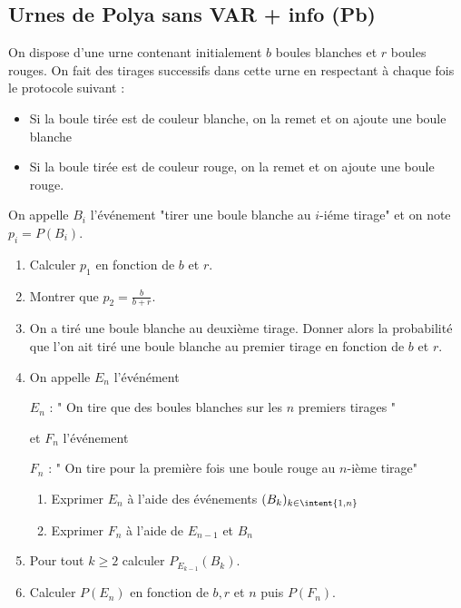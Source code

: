 \subsection{Urnes de Polya sans VAR + info (Pb)}
\begin{exercice}
On dispose d'une urne contenant initialement $b$ boules blanches et $r$ boules rouges. On fait des tirages successifs dans cette urne en respectant à chaque fois le protocole suivant : 
\begin{itemize}
\item Si la boule tirée est de couleur blanche, on la remet et on ajoute une boule blanche 
\item Si la boule tirée est de couleur rouge, on la remet et on ajoute une boule rouge.  
\end{itemize}

On appelle $B_i$ l'événement "tirer une boule blanche au $i$-iéme tirage" et on note $p_i =P(B_i)$. 

\begin{enumerate}
\item Calculer $p_1$ en fonction de $b$ et $r$.
\item Montrer que $p_2= \frac{b}{b+r}  $.
\item On a tiré une boule blanche au deuxième tirage. Donner alors la probabilité que l'on ait tiré une boule blanche au premier tirage  en fonction de $b$ et $r$. 
\item On appelle $E_n$  l'événément 
\begin{center}
$E_n$ : " On tire que des boules blanches sur les $n$ premiers tirages "
\end{center}

et $F_n$ l'événement
\begin{center}
$F_n$ : " On tire  pour la première fois une boule rouge au $n$-ième tirage"
\end{center}

\begin{enumerate}
\item Exprimer $E_n$  à l'aide des événements $(B_k)_{k\in \intent{1,n}} $ 
\item Exprimer $F_n$  à l'aide de $E_{n-1}$ et $B_n$ 
\end{enumerate}


\item Pour tout $k\geq 2$ calculer $P_{E_{k-1}}(B_k)$.
\item Calculer $P(E_n)$ en fonction de $b, r$ et $n$ puis $P(F_n)$.


\end{enumerate}
\end{exercice}
